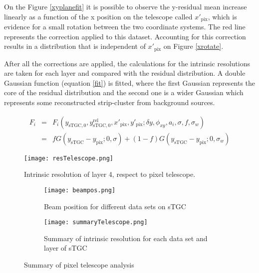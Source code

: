 	On the Figure \ref{xyplanefit} it is possible to observe the y-residual mean increase linearly as a function of the x
	position on the telescope called $x'_{\mathrm{pix}}$, which is evidence for a small rotation between the two
	coordinate systems. The red line represents the correction applied to this dataset. Accounting for this correction
	results in a distribution that is independent of $x'_{\mathrm{pix}}$ on Figure \ref{xrotate}.\par

 After all the corrections are applied, the calculations for the intrinsic resolutions are taken for each layer 
 and compared with  the residual distribution. A double Gaussian function (equation \ref{fit}) is fitted, where the first
 Gaussian represents the core of the residual distribution and the second one is a wider Gaussian which represents some
 reconstructed strip-cluster from background sources. \par
 
 \begin{eqnarray}
	F_i &=& F_i(y_{\mathrm{sTGC},0}, y_{\mathrm{sTGC},0}^{\mathrm{rel}}, x'_{\mathrm{pix}},y'_{\mathrm{pix}};\delta y,\phi_{xy},a_i,\sigma,f,\sigma_w)\\
			&=& f G(y_{\mathrm{sTGC}}-y_{\mathrm{pix}};0,\sigma) +
			(1-f)G(y_{\mathrm{sTGC}}-y_{\mathrm{pix}};0,\sigma_w)\label{fit}
	\end{eqnarray}


\begin{figure}[ht]
	\centering
	\texttt{[image: resTelescope.png]}
	\caption{Intrinsic resolution of layer 4, respect to pixel telescope.}\label{restelescope}
	\end{figure}

	\begin{figure}[ht]
	\centering
		\hspace*{\fill}
	\begin{subfigure}[b]{0.3\textwidth}
	\texttt{[image: beampos.png]}
	\caption{Beam position for different data sets on sTGC}\label{beampos}
	\end{subfigure}
	\hfill
	\begin{subfigure}[b]{0.45\textwidth}
	\centering
	\texttt{[image: summaryTelescope.png]}
	\caption{Summary of intrinsic resolution for each data set and layer of sTGC}\label{summary}
	\end{subfigure}
	\hspace*{\fill}
	\caption{Summary of pixel telescope analysis}\label{}
\end{figure}


